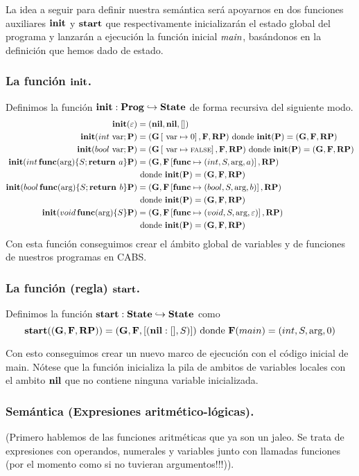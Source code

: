 La idea a seguir para definir nuestra semántica será apoyarnos en dos funciones auxiliares $\textbf{init}$ y $\textbf{start}$ que respectivamente inicializarán el estado global del programa y lanzarán a ejecución la función inicial $\textit{main}$, basándonos en la definición que hemos dado de estado.

\subsubsection{La función $\textbf{init}$.}
Definimos la función $\textbf{init}: \textbf{Prog} \hookrightarrow \textbf{State}$ de forma recursiva del siguiente modo.
\begin{align*}
  \textbf{init}(\varepsilon) &= (\textbf{nil}, \textbf{nil}, [])\\
  \textbf{init}(int \text{ var} \mbox{;\,} \mathbf{P}) &= (\mathbf{G}\left[ \text{ var}\mapsto0 \right], \mathbf{F}, \textbf{RP}) \text{ donde } \textbf{init}(\mathbf{P}) = (\mathbf{G}, \mathbf{F}, \textbf{RP})\\
  \textbf{init}(bool \text{ var} \mbox{;\,} \mathbf{P}) &= (\mathbf{G}\left[ \text{ var}\mapsto\text{\scriptsize{FALSE}} \right], \mathbf{F}, \textbf{RP}) \text{ donde } \textbf{init}(\mathbf{P}) = (\mathbf{G}, \mathbf{F}, \textbf{RP})\\
  \textbf{init}(int \, \textbf{func}(\text{arg}) \{ S\mbox{;\,} \textbf{return } a\} \mathbf{P}) &= (\mathbf{G}, \mathbf{F}\left[ \textbf{func}\mapsto(int, S, \text{arg}, a) \right], \textbf{RP}) \\ &\text{ donde } \textbf{init}(\mathbf{P}) = (\mathbf{G}, \mathbf{F}, \textbf{RP})\\
  \textbf{init}(bool \, \textbf{func}(\text{arg}) \{ S\mbox{;\,} \textbf{return } b\} \mathbf{P}) &= (\mathbf{G}, \mathbf{F}\left[ \textbf{func}\mapsto(bool, S, \text{arg}, b) \right], \textbf{RP}) \\ &\text{ donde } \textbf{init}(\mathbf{P}) = (\mathbf{G}, \mathbf{F}, \textbf{RP})\\
  \textbf{init}(void \, \textbf{func}(\text{arg}) \{ S\} \mathbf{P}) &= (\mathbf{G}, \mathbf{F}\left[ \textbf{func}\mapsto(void, S, \text{arg}, \varepsilon) \right], \textbf{RP}) \\ &\text{ donde } \textbf{init}(\mathbf{P}) = (\mathbf{G}, \mathbf{F}, \textbf{RP})\\
\end{align*}
Con esta función conseguimos crear el ámbito global de variables y de funciones de nuestros programas en CABS.

\subsubsection{La función (regla) $\textbf{start}$.}
Definimos la función $\textbf{start}: \textbf{State} \hookrightarrow \textbf{State}$ como
$$
\textbf{start}((\mathbf{G}, \mathbf{F}, \textbf{RP})) = (\mathbf{G}, \mathbf{F}, [(\textbf{nil}:[], S)]) \text{ donde } \mathbf{F}(main) = (int, S, \text{arg}, 0)
$$

Con esto conseguimos crear un nuevo marco de ejecución con el código inicial de main. Nótese que la función inicializa la pila de ambitos de variables locales con el ambito $\textbf{nil}$ que no contiene ninguna variable inicializada.

\subsubsection{Semántica (Expresiones aritmético-lógicas).}
(Primero hablemos de las funciones aritméticas que ya son un jaleo. Se trata de expresiones con operandos, numerales y variables junto con llamadas funciones (por el momento como si no tuvieran argumentos!!!)).\\

